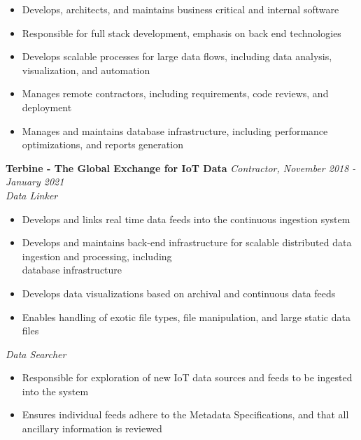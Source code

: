 \documentclass{res}
\begin{document}
\begin{resume}
			\begin{itemize} \itemsep -2pt
				\item Develops, architects, and maintains business critical and internal software
				\item Responsible for full stack development, emphasis on back end technologies
				\item Develops scalable processes for large data flows, including data analysis, visualization, and automation
				\item Manages remote contractors, including requirements, code reviews, and deployment
                \item Manages and maintains database infrastructure, including performance optimizations, and reports generation
			\end{itemize} \vspace{-2mm}
    
		{\bf Terbine - The Global Exchange for IoT Data} \hfill \emph{Contractor, November 2018 - January 2021} \\
			\emph{Data Linker}

			\begin{itemize} \itemsep -2pt
				\item Develops and links real time data feeds into the continuous ingestion system
				\item Develops and maintains back-end infrastructure for scalable distributed data ingestion and processing, including \  \\
        database infrastructure
				\item Develops data visualizations based on archival and continuous data feeds
				\item Enables handling of exotic file types, file manipulation, and large static data files
			\end{itemize} \vspace{-2mm}

			\emph{Data Searcher}

			\begin{itemize} \itemsep -2pt
				\item Responsible for exploration of new IoT data sources and feeds to be ingested into the system
				\item Ensures individual feeds adhere to the Metadata Specifications, and that all ancillary information is reviewed
			\end{itemize} \vspace{-2mm}

        \begin{comment}
		{\bf Academic Success Center, UNLV} \hfill \emph{Summers of 2017, 2018, 2019} \\
			\emph{Team Lead}


\end{comment}
\end{resume}
\end{document}
